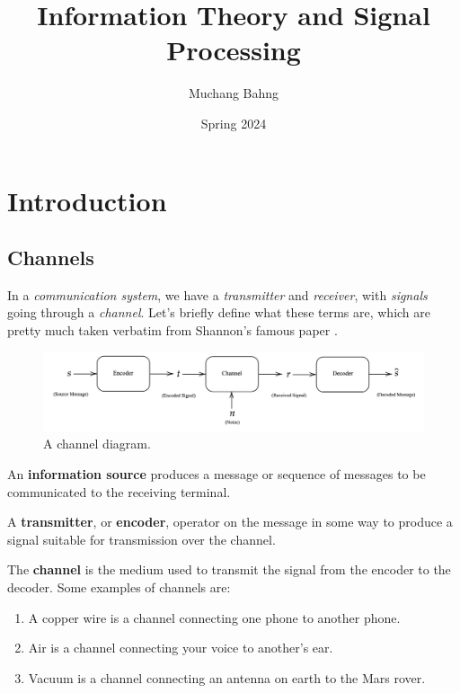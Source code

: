 \documentclass{article}
\begin{document}
\title{Information Theory and Signal Processing} 
\author{Muchang Bahng}
\date{Spring 2024}

\maketitle
\tableofcontents
\pagebreak

\section{Introduction}

  \subsection{Channels}

    In a \textit{communication system}, we have a \textit{transmitter} and \textit{receiver}, with \textit{signals} going through a \textit{channel}. Let's briefly define what these terms are, which are pretty much taken verbatim from Shannon's famous paper \cite{shannon}. 

    \begin{figure}[H]
      \centering 
      \includegraphics[scale=0.35]{img/channel_diagram.png}
      \caption{A channel diagram. } 
      \label{fig:channel_diagram}
    \end{figure}

    \begin{definition}
      An \textbf{information source} produces a message or sequence of messages to be communicated to the receiving terminal.  
    \end{definition}

    \begin{definition}[Encoder]
      A \textbf{transmitter}, or \textbf{encoder}, operator on the message in some way to produce a signal suitable for transmission over the channel. 
    \end{definition}

    \begin{definition}[Channel]
      The \textbf{channel} is the medium used to transmit the signal from the encoder to the decoder. Some examples of channels are: 
      \begin{enumerate}
        \item A copper wire is a channel connecting one phone to another phone. 
        \item Air is a channel connecting your voice to another's ear. 
        \item Vacuum is a channel connecting an antenna on earth to the Mars rover.  
      \end{enumerate}
    \end{definition}
\end{document}
